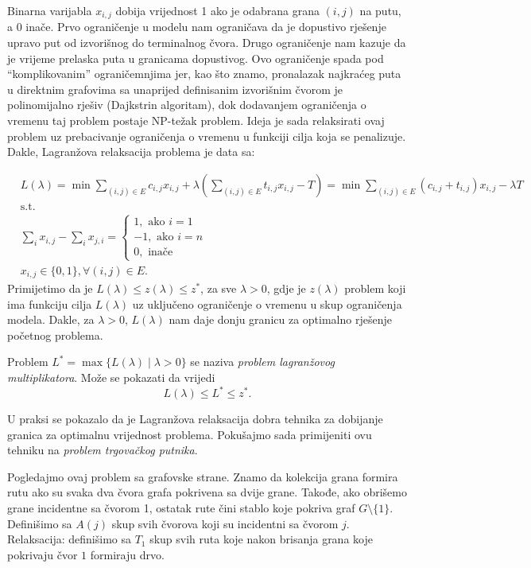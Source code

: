 \documentclass[a4paper, utf8, 11pt, colorlinks]{article}
\begin{document}
Binarna varijabla $x_{i,j}$ dobija vrijednost 1 ako je odabrana grana $(i,j)$ na   putu, a 0 inače.  
Prvo ograničenje u modelu nam ograničava da je dopustivo rješenje upravo put od izvorišnog do terminalnog čvora. Drugo ograničenje nam kazuje da je vrijeme prelaska puta u granicama dopustivog. Ovo ograničenje spada pod ``komplikovanim'' ograničemnjima jer, kao što znamo,  pronalazak najkraćeg puta u direktnim grafovima sa unaprijed definisanim izvorišnim čvorom je polinomijalno rješiv (Dajkstrin algoritam), dok dodavanjem ograničenja o vremenu taj problem postaje NP-težak problem. Ideja je sada relaksirati ovaj problem uz prebacivanje ograničenja o vremenu u funkciji cilja koja se  penalizuje. 
Dakle, Lagranžova relaksacija problema je data sa:

\begin{align*}
       &L(\lambda)= \min\sum_{(i,j) \in E }c_{i,j}x_{i,j}  + \lambda(\sum_{(i,j) \in E} t_{i,j} x_{i,j} - T ) = \min \sum_{(i,j) \in E} (c_{i,j} + t_{i,j} )x_{i,j} - \lambda T \\
        &\mbox{s.t. }\\
    & \sum_{i} x_{i,j} - \sum_{i} x_{j,i} = \begin{cases}  
                                               1, \mbox{ ako } i=1 \\
                                              -1, \mbox{ ako } i=n \\
                                               0, \mbox{ inače }
                                            \end{cases} \\
     & x_{i,j} \in \{0, 1 \}, \forall (i,j) \in E.
\end{align*}
Primijetimo da je $L(\lambda) \leq z(\lambda)  \leq z^*$, za sve $\lambda > 0$, gdje je $z(\lambda)$ problem koji ima funkciju cilja $L(\lambda)$ uz uključeno ograničenje o vremenu u skup ograničenja modela. Dakle, za $\lambda >0$, $L(\lambda)$ nam daje donju granicu za optimalno rješenje početnog problema. 

Problem $L^* = \max \{ L(\lambda) \mid \lambda > 0  \}$ se naziva \emph{problem lagranžovog multiplikatora}. Može se pokazati da vrijedi 
$$ L(\lambda) \leq L^* \leq z^*.$$

U praksi se pokazalo da je Lagranžova relaksacija dobra tehnika za dobijanje granica za optimalnu vrijednost problema. Pokušajmo sada primijeniti ovu tehniku na \emph{problem trgovačkog putnika}.  

Pogledajmo ovaj problem sa grafovske strane. Znamo da kolekcija grana formira rutu ako su svaka dva čvora grafa pokrivena sa dvije grane. Takođe, ako obrišemo grane incidentne sa čvorom 1, ostatak rute čini stablo koje pokriva graf  $G\setminus \{1\}$.  
Definišimo sa $A(j)$ skup svih čvorova koji su incidentni sa čvorom $j$. Relaksacija: definišimo sa $T_1$ skup svih ruta koje nakon brisanja grana koje pokrivaju čvor $1$ formiraju drvo.  
\end{document}
